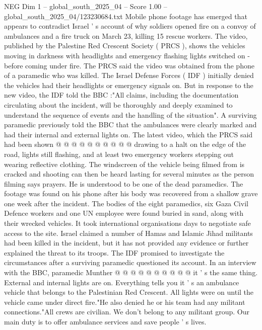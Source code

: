 \begin{textsample}{NEG Dim 1 – global\_south\_2025\_04 – Score 1.00 – global\_south\_2025\_04/123230684.txt}  \label{ex:f1_neg_132}
Mobile phone footage has emerged that appears to contradict Israel ' s account of why soldiers opened fire on a convoy of ambulances and a fire truck on March 23, killing 15 rescue workers.
The video, published by the Palestine Red Crescent Society ( PRCS ), shows the vehicles moving in darkness with headlights and emergency flashing lights switched on - before coming under fire.
The PRCS said the video was obtained from the phone of a paramedic who was killed.
The Israel Defense Forces ( IDF ) initially denied the vehicles had their headlights or emergency signals on.
But in response to the new video, the IDF told the BBC :"All claims, including the documentation circulating about the incident, will be thoroughly and deeply examined to understand the sequence of events and the handling of the situation".
A surviving paramedic previously told the BBC that the ambulances were clearly marked and had their internal and external lights on.
The latest video, which the PRCS said had been shown @ @ @ @ @ @ @ @ @ @ drawing to a halt on the edge of the road, lights still flashing, and at least two emergency workers stepping out wearing reflective clothing.
The windscreen of the vehicle being filmed from is cracked and shooting can then be heard lasting for several minutes as the person filming says prayers.
He is understood to be one of the dead paramedics.
The footage was found on his phone after his body was recovered from a shallow grave one week after the incident.
The bodies of the eight paramedics, six Gaza Civil Defence workers and one UN employee were found buried in sand, along with their wrecked vehicles.
It took international organisations days to negotiate safe access to the site.
Israel claimed a number of Hamas and Islamic Jihad militants had been killed in the incident, but it has not provided any evidence or further explained the threat to its troops.
The IDF promised to investigate the circumstances after a surviving paramedic questioned its account.
In an interview with the BBC, paramedic Munther @ @ @ @ @ @ @ @ @ @ it ' s the same thing.
External and internal lights are on.
Everything tells you it ' s an ambulance vehicle that belongs to the Palestinian Red Crescent.
All lights were on until the vehicle came under direct fire."He also denied he or his team had any militant connections."All crews are civilian.
We don't belong to any militant group.
Our main duty is to offer ambulance services and save people ' s lives.

\end{textsample}
